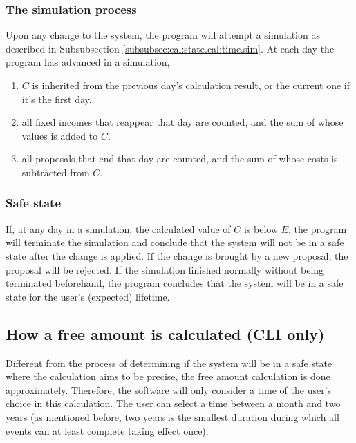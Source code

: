 \subsubsection{The simulation process}
Upon any change to the system, the program will attempt a simulation as described in Subsubsection \ref{subsubsec:cal:state.cal:time.sim}. At each day the program has advanced in a simulation,
\begin{enumerate}
	\item $C$ is inherited from the previous day's calculation result, or the current one if it's the first day.
	\item all fixed incomes that reappear that day are counted, and the sum of whose values is added to $C$.
	\item all proposals that end that day are counted, and the sum of whose costs is subtracted from $C$.
\end{enumerate}

\subsubsection{Safe state}
If, at any day in a simulation, the calculated value of $C$ is below $E$, the program will terminate the simulation and conclude that the system will not be in a safe state after the change is applied. If the change is brought by a new proposal, the proposal will be rejected. If the simulation finished normally without being terminated beforehand, the program concludes that the system will be in a safe state for the user's (expected) lifetime.

\subsection{How a free amount is calculated (CLI only)}
Different from the process of determining if the system will be in a safe state where the calculation aims to be precise, the free amount calculation is done approximately. Therefore, the software will only consider a time of the user's choice in this calculation. The user can select a time between a month and two years (as mentioned before, two years is the smallest duration during which all events can at least complete taking effect once).

